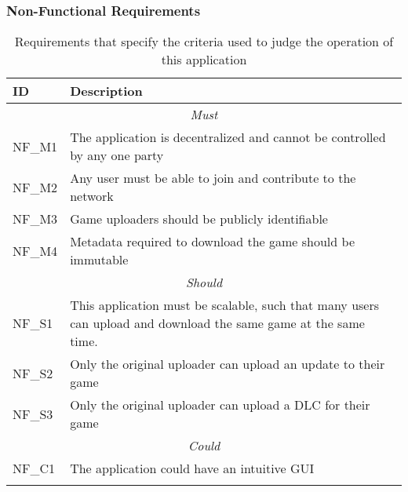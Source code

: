 \subsubsection*{Non-Functional Requirements}

\begin{longtable}{ p{} p{} }
  \toprule
  \textbf{ID} & \textbf{Description}
  \\\midrule\midrule
  \multicolumn{2}{c}{\cellcolor{red!70}\textit{Must}}                                                                           \\\midrule
  NF\_M1      & The application is decentralized and cannot be controlled by any one party                                      \\
  NF\_M2      & Any user must be able to join and contribute to the network                                                     \\
  NF\_M3      & Game uploaders should be publicly identifiable                                                                  \\
  NF\_M4      & Metadata required to download the game should be immutable                                                      \\
  \midrule\multicolumn{2}{c}{\cellcolor{orange!70}\textit{Should}}                                                              \\\midrule
  NF\_S1      & This application must be scalable, such that many users can upload and download the same game at the same time. \\
  NF\_S2      & Only the original uploader can upload an update to their game                                                   \\
  NF\_S3      & Only the original uploader can upload a DLC for their game                                                      \\
  \midrule\multicolumn{2}{c}{\cellcolor{green}\textit{Could}}                                                                   \\\midrule
  NF\_C1      & The application could have an intuitive GUI                                                                     \\
  \midrule
  \bottomrule
  \caption{Requirements that specify the criteria used to judge the operation of this application}
  \label{tab:non-functional-requirements}
\end{longtable}